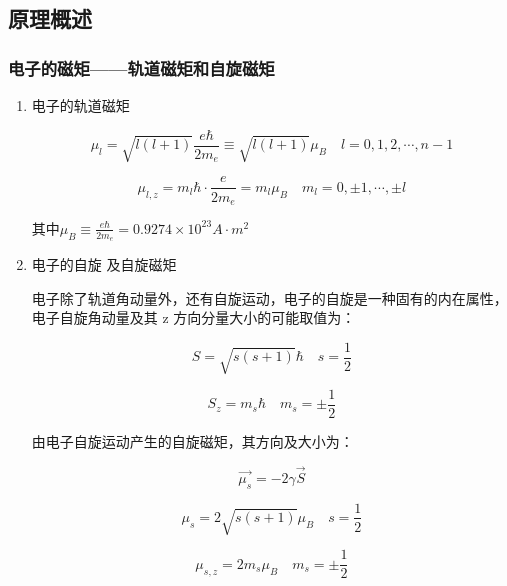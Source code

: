\documentclass[dvipsnames, svgnames,a4paper,11pt]{article}
\begin{document}
\subsection{原理概述}


        
    \subsubsection{电子的磁矩——轨道磁矩和自旋磁矩}

		\begin{enumerate}
			\item 电子的轨道磁矩

				\[
					\mu_l = \sqrt{l(l+1)}\frac{e \hbar}{2 m_e} \equiv \sqrt{l(l+1)}\mu_B \quad l=0,1,2,\cdots , n-1	
				\]

				\[
					\mu_{l,z} = m_l \hbar \cdot \frac{e}{2 m_e} = m_l \mu_B \quad m_l = 0,\pm 1,\cdots ,\pm l	
				\]

				其中$\mu_B \equiv \frac{e \hbar}{2 m_e} =0.9274 \times 10^{23} A\cdot m^2$



			\item 电子的自旋 及自旋磁矩
			
				电子除了轨道角动量外，还有自旋运动，电子的自旋是一种固有的内在属性，电子自旋角动量及其 z 方向分量大小的可能取值为：

				\[
					S = \sqrt{s(s+1)}\hbar \quad s = \frac{1}{2}	
				\]

				\[
					S_z = m_s \hbar \quad m_s = \pm \frac{1}{2}	
				\]



				由电子自旋运动产生的自旋磁矩，其方向及大小为：

				\[
					\vec{\mu_s} = -2 \gamma \vec{S}
				\]

				\[
					\mu_s = 2\sqrt{s(s+1)}\mu_B \quad s = \frac{1}{2}
				\]

				\[
					\mu_{s,z} = 2 m_s \mu_B \quad m_s = \pm \frac{1}{2}
				\]




\end{enumerate}
\end{document}
